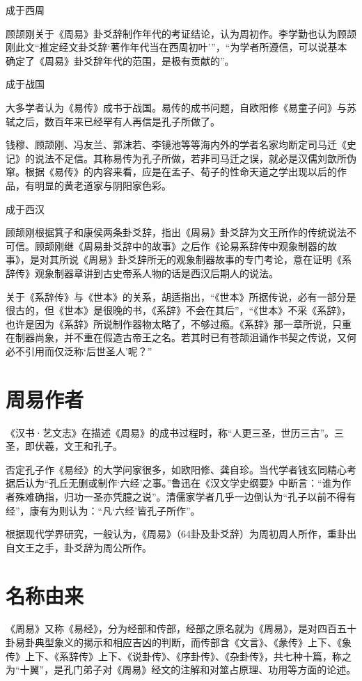 \documentclass[12pt,UTF8]{ctexbook}
\begin{document}
成于西周

顾颉刚关于《周易》卦爻辞制作年代的考证结论，认为周初作。李学勤也认为顾颉刚此文“推定经文卦爻辞‘著作年代当在西周初叶’”，“为学者所遵信，可以说基本确定了《周易》卦爻辞年代的范围，是极有贡献的”。

成于战国

大多学者认为《易传》成书于战国。易传的成书问题，自欧阳修《易童子问》与苏轼之后，数百年来已经罕有人再信是孔子所做了。

钱穆、顾颉刚、冯友兰、郭沫若、李镜池等等海内外的学者名家均断定司马迁《史记》的说法不足信。其称易传为孔子所做，若非司马迁之误，就必是汉儒刘歆所伪窜。根据《易传》的内容来看，应是在孟子、荀子的性命天道之学出现以后的作品，有明显的黄老道家与阴阳家色彩。

成于西汉

顾颉刚根据箕子和康侯两条卦爻辞，指出《周易》卦爻辞为文王所作的传统说法不可信。顾颉刚继《周易卦爻辞中的故事》之后作《论易系辞传中观象制器的故事》，是对其所说《周易》卦爻辞所无的观象制器故事的专门考论，意在证明《系辞传》观象制器章讲到古史帝系人物的话是西汉后期人的说法。

关于《系辞传》与《世本》的关系，胡适指出，“《世本》所据传说，必有一部分是很古的，但《世本》是很晚的书，《系辞》不会在其后”，“《世本》不采《系辞》，也许是因为《系辞》所说制作器物太略了，不够过瘾。《系辞》那一章所说，只重在制器尚象，并不重在假造古帝王之名。若其时已有苍颉沮诵作书契之传说，又何必不引用而仅泛称‘后世圣人’呢？”

\section{周易作者}

《汉书·艺文志》在描述《周易》的成书过程时，称“人更三圣，世历三古”。三圣，即伏羲，文王和孔子。

否定孔子作《易经》的大学问家很多，如欧阳修、龚自珍。当代学者钱玄同精心考据后认为“孔丘无删或制作‘六经’之事。”鲁迅在《汉文学史纲要》中断言：“谁为作者殊难确指，归功一圣亦凭臆之说”。清儒家学者几乎一边倒认为“孔子以前不得有经”，康有为则认为：“凡‘六经’皆孔子所作”。

根据现代学界研究，一般认为，《周易》（64卦及卦爻辞）为周初周人所作，重卦出自文王之手，卦爻辞为周公所作。

\section{名称由来}

《周易》又称《易经》，分为经部和传部，经部之原名就为《周易》，是对四百五十卦易卦典型象义的揭示和相应吉凶的判断，而传部含《文言》、《彖传》上下、《象传》上下、《系辞传》上下、《说卦传》、《序卦传》、《杂卦传》，共七种十篇，称之为“十翼”，是孔门弟子对《周易》经文的注解和对筮占原理、功用等方面的论述。
\end{document}
